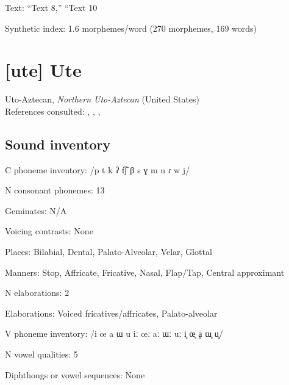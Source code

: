 {\begin{appendixdesc}

\item[Text:] “Text 8,” “Text 10 \citep[902--905]{Olawsky2006}

\item[Synthetic index:] 1.6 morphemes/word (270 morphemes, 169 words)
\end{appendixdesc}

\section*{[ute] Ute}   %
Uto-Aztecan, \textit{Northern Uto-Aztecan} (United States)\medskip\\
References consulted: \citet{Givón2011}, \citet{Givón2013}, \citet{Harms1966}, \citet{Oberly2013}

\subsection*{Sound inventory}
\begin{appendixdesc}

\item[C phoneme inventory:] /p t k ʔ t͡ʃ β s ɣ m n ɾ w j/

\item[N consonant phonemes:] 13

\item[Geminates:] N/A

\item[Voicing contrasts:] None

\item[Places:] Bilabial, Dental, Palato-Alveolar, Velar, Glottal

\item[Manners:] Stop, Affricate, Fricative, Nasal, Flap/Tap, Central approximant

\item[N elaborations:] 2

\item[Elaborations:] Voiced fricatives/affricates, Palato-alveolar

\item[V phoneme inventory:] /i œ a ɯ u iː œː aː ɯː uː i̥ œ̥ ḁ ɯ̥ u̥/

\item[N vowel qualities:] 5

\item[Diphthongs or vowel sequences:] None


\end{appendixdesc}}
